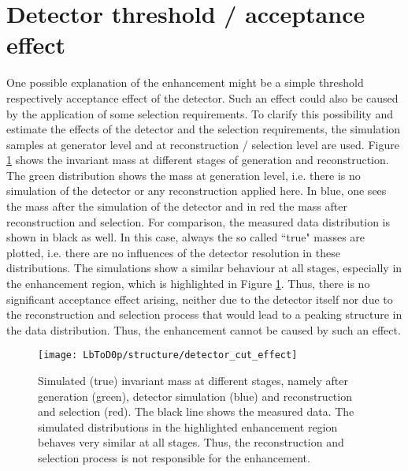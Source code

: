 \section{Detector threshold / acceptance effect}
One possible explanation of the enhancement might be a simple threshold respectively acceptance effect of the detector.
Such an effect could also be caused by the application of some selection requirements.
To clarify this possibility and estimate the effects of the detector and the selection requirements, the simulation samples at generator level and at reconstruction / selection level are used.
Figure \ref{fig:detector_cut_effect} shows the invariant \Dz\proton mass at different stages of generation and reconstruction.
The green distribution shows the \Dz\proton mass at generation level, i.e. there is no simulation of the detector or any reconstruction applied here.
In blue, one sees the \Dz\proton mass after the simulation of the detector and in red the mass after reconstruction and selection.
For comparison, the measured data distribution is shown in black as well.
In this case, always the so called ``true" masses are plotted, i.e. there are no influences of the detector resolution in these distributions.
The simulations show a similar behaviour at all stages, especially in the enhancement region, which is highlighted in Figure \ref{fig:detector_cut_effect}.
Thus, there is no significant acceptance effect arising, neither due to the detector itself nor due to the reconstruction and selection process that would lead to a peaking structure in the data distribution. 
Thus, the enhancement cannot be caused by such an effect.
\begin{figure}[tb]
	\centering
	\texttt{[image: LbToD0p/structure/detector\_cut\_effect]}
	\caption{Simulated (true) invariant \Dz\proton mass at different stages, namely after generation (green), detector simulation (blue) and reconstruction and selection (red). The black line shows the measured data. The simulated distributions in the highlighted enhancement region behaves very
    similar at all stages. Thus, the reconstruction and selection process is not responsible for the enhancement.}
	\label{fig:detector_cut_effect}
\end{figure}

